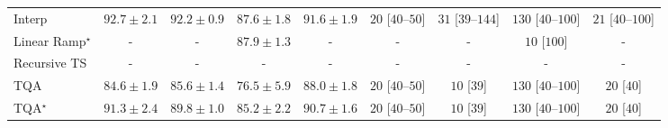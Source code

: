\begin{tabular}{l|cccc|cccc|}
Interp & {\cellcolor[HTML]{056C39}} \color[HTML]{F1F1F1} $92.7\pm 2.1$ & {\cellcolor[HTML]{096F3A}} \color[HTML]{F1F1F1} $92.2\pm 0.9$ & {\cellcolor[HTML]{2F944E}} \color[HTML]{F1F1F1} $87.6\pm 1.8$ & {\cellcolor[HTML]{0E743C}} \color[HTML]{F1F1F1} $91.6\pm 1.9$ & {\cellcolor[HTML]{FFF5F1}} \color[HTML]{000000} $20$ [$40$--$50$] & {\cellcolor[HTML]{FFF2EE}} \color[HTML]{000000} $31$ [$39$--$144$] & {\cellcolor[HTML]{FDD6D2}} \color[HTML]{000000} $130$ [$40$--$100$] & {\cellcolor[HTML]{FFF4F0}} \color[HTML]{000000} $21$ [$40$--$100$] \\
Linear Ramp$^\star$ & {\cellcolor[HTML]{000000}} \color[HTML]{F1F1F1} {\cellcolor{white}} \color{black} - & {\cellcolor[HTML]{000000}} \color[HTML]{F1F1F1} {\cellcolor{white}} \color{black} - & {\cellcolor[HTML]{2D914B}} \color[HTML]{F1F1F1} $87.9\pm 1.3$ & {\cellcolor[HTML]{000000}} \color[HTML]{F1F1F1} {\cellcolor{white}} \color{black} - & {\cellcolor[HTML]{000000}} \color[HTML]{F1F1F1} {\cellcolor{white}} \color{black} - & {\cellcolor[HTML]{000000}} \color[HTML]{F1F1F1} {\cellcolor{white}} \color{black} - & {\cellcolor[HTML]{FFF7F3}} \color[HTML]{000000} $10$ [$100$] & {\cellcolor[HTML]{000000}} \color[HTML]{F1F1F1} {\cellcolor{white}} \color{black} - \\
Recursive TS & {\cellcolor[HTML]{000000}} \color[HTML]{F1F1F1} {\cellcolor{white}} \color{black} - & {\cellcolor[HTML]{000000}} \color[HTML]{F1F1F1} {\cellcolor{white}} \color{black} - & {\cellcolor[HTML]{000000}} \color[HTML]{F1F1F1} {\cellcolor{white}} \color{black} - & {\cellcolor[HTML]{000000}} \color[HTML]{F1F1F1} {\cellcolor{white}} \color{black} - & {\cellcolor[HTML]{000000}} \color[HTML]{F1F1F1} {\cellcolor{white}} \color{black} - & {\cellcolor[HTML]{000000}} \color[HTML]{F1F1F1} {\cellcolor{white}} \color{black} - & {\cellcolor[HTML]{000000}} \color[HTML]{F1F1F1} {\cellcolor{white}} \color{black} - & {\cellcolor[HTML]{000000}} \color[HTML]{F1F1F1} {\cellcolor{white}} \color{black} - \\
TQA & {\cellcolor[HTML]{4AB062}} \color[HTML]{F1F1F1} $84.6\pm 1.9$ & {\cellcolor[HTML]{3FA85B}} \color[HTML]{F1F1F1} $85.6\pm 1.4$ & {\cellcolor[HTML]{B6E192}} \color[HTML]{000000} $76.5\pm 5.9$ & {\cellcolor[HTML]{2D914B}} \color[HTML]{F1F1F1} $88.0\pm 1.8$ & {\cellcolor[HTML]{FFF5F1}} \color[HTML]{000000} $20$ [$40$--$50$] & {\cellcolor[HTML]{FFF7F3}} \color[HTML]{000000} $10$ [$39$] & {\cellcolor[HTML]{FDD6D2}} \color[HTML]{000000} $130$ [$40$--$100$] & {\cellcolor[HTML]{FFF5F1}} \color[HTML]{000000} $20$ [$40$] \\
TQA$^\star$ & {\cellcolor[HTML]{11753D}} \color[HTML]{F1F1F1} $91.3\pm 2.4$ & {\cellcolor[HTML]{1E8041}} \color[HTML]{F1F1F1} $89.8\pm 1.0$ & {\cellcolor[HTML]{42AB5D}} \color[HTML]{F1F1F1} $85.2\pm 2.2$ & {\cellcolor[HTML]{167A3F}} \color[HTML]{F1F1F1} $90.7\pm 1.6$ & {\cellcolor[HTML]{FFF5F1}} \color[HTML]{000000} $20$ [$40$--$50$] & {\cellcolor[HTML]{FFF7F3}} \color[HTML]{000000} $10$ [$39$] & {\cellcolor[HTML]{FDD6D2}} \color[HTML]{000000} $130$ [$40$--$100$] & {\cellcolor[HTML]{FFF5F1}} \color[HTML]{000000} $20$ [$40$] \\

\end{tabular}
